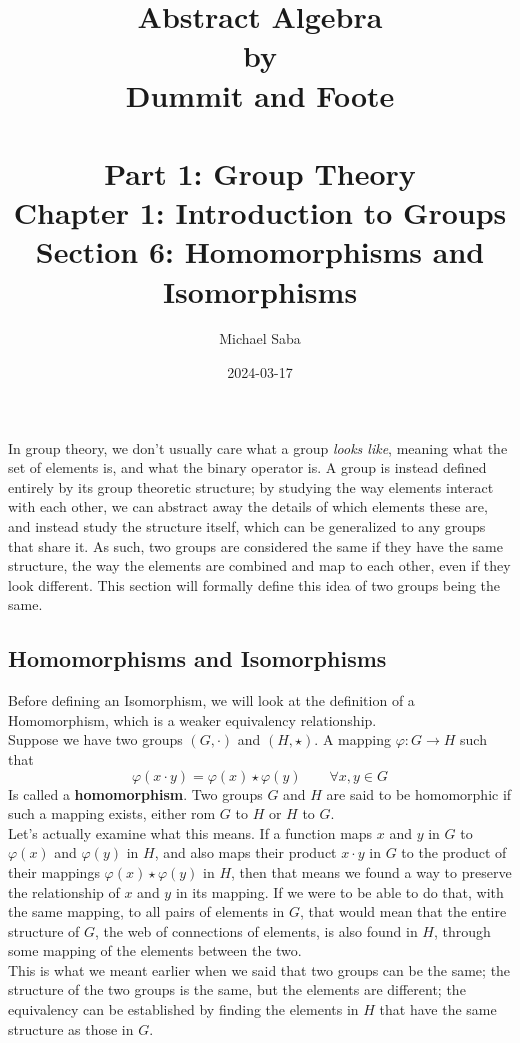 \documentclass[12pt]{article}
\title{%
    \Huge Abstract Algebra \\
    \large by \\
    \Large Dummit and Foote \\~\\
    \huge Part 1: Group Theory \\
    \LARGE Chapter 1: Introduction to Groups \\
    \Large Section 6: Homomorphisms and Isomorphisms
}
\date{2024-03-17}
\author{Michael Saba}
\begin{document}
    \maketitle
    \newpage
    \setlength{\parindent}{0pt}


    In group theory, we don't usually care what a group
    \textit{looks like}, meaning what the set of elements is,
    and what the binary operator is.
    A group is instead defined entirely by its group theoretic structure;
    by studying the way elements interact with each other,
    we can abstract away the details of which elements these are,
    and instead study the structure itself,
    which can be generalized to any groups that share it.
    As such, two groups are considered the same if they have the
    same structure,
    the way the elements are combined and map to each other,
    even if they look different.
    This section will formally define this idea of two groups being
    the same. \\

    \subsection*{Homomorphisms and Isomorphisms}

    Before defining an Isomorphism,
    we will look at the definition of a Homomorphism,
    which is a weaker equivalency relationship. \\
    Suppose we have two groups $(G, \cdot)$ and $(H, \star)$.
    A mapping $\varphi: G \rightarrow H$ such that
    \[ \varphi(x \cdot y) = \varphi(x) \star \varphi(y) 
    \qquad \forall x, y \in G \]
    Is called a \textbf{homomorphism}.
    Two groups $G$ and $H$ are said to be homomorphic
    if such a mapping exists, either rom $G$ to $H$ or $H$ to $G$. \\

    Let's actually examine what this means.
    If a function maps $x$ and $y$ in $G$
    to $\varphi(x)$ and $\varphi(y)$ in $H$,
    and also maps their product $x \cdot y$ in $G$
    to the product of their mappings $\varphi(x) \star \varphi(y)$ in $H$,
    then that means we found a way
    to preserve the relationship of $x$ and $y$
    in its mapping.
    If we were to be able to do that, with the same mapping,
    to all pairs of elements in $G$,
    that would mean that the entire structure of $G$,
    the web of connections of elements,
    is also found in $H$,
    through some mapping of the elements between the two. \\
    This is what we meant earlier when we said that two groups
    can be the same;
    the structure of the two groups is the same,
    but the elements are different;
    the equivalency can be established by finding
    the elements in $H$ that have the same structure as those in $G$. \\
\end{document}

